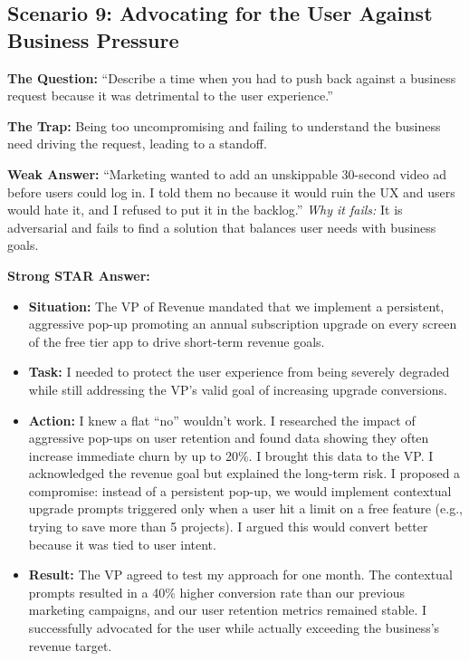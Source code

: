 \subsection{Scenario 9: Advocating for the User Against Business
Pressure}\label{scenario-9-advocating-for-the-user-against-business-pressure}

\textbf{The Question:} ``Describe a time when you had to push back
against a business request because it was detrimental to the user
experience.''

\textbf{The Trap:} Being too uncompromising and failing to understand
the business need driving the request, leading to a standoff.

\textbf{Weak Answer:} ``Marketing wanted to add an unskippable 30-second
video ad before users could log in. I told them no because it would ruin
the UX and users would hate it, and I refused to put it in the
backlog.'' \emph{Why it fails:} It is adversarial and fails to find a
solution that balances user needs with business goals.

\textbf{Strong STAR Answer:}

\begin{itemize}
\tightlist
\item
  \textbf{Situation:} The VP of Revenue mandated that we implement a
  persistent, aggressive pop-up promoting an annual subscription upgrade
  on every screen of the free tier app to drive short-term revenue
  goals.
\item
  \textbf{Task:} I needed to protect the user experience from being
  severely degraded while still addressing the VP's valid goal of
  increasing upgrade conversions.
\item
  \textbf{Action:} I knew a flat ``no'' wouldn't work. I researched the
  impact of aggressive pop-ups on user retention and found data showing
  they often increase immediate churn by up to 20\%. I brought this data
  to the VP. I acknowledged the revenue goal but explained the long-term
  risk. I proposed a compromise: instead of a persistent pop-up, we
  would implement contextual upgrade prompts triggered only when a user
  hit a limit on a free feature (e.g., trying to save more than 5
  projects). I argued this would convert better because it was tied to
  user intent.
\item
  \textbf{Result:} The VP agreed to test my approach for one month. The
  contextual prompts resulted in a 40\% higher conversion rate than our
  previous marketing campaigns, and our user retention metrics remained
  stable. I successfully advocated for the user while actually exceeding
  the business's revenue target.
\end{itemize}

